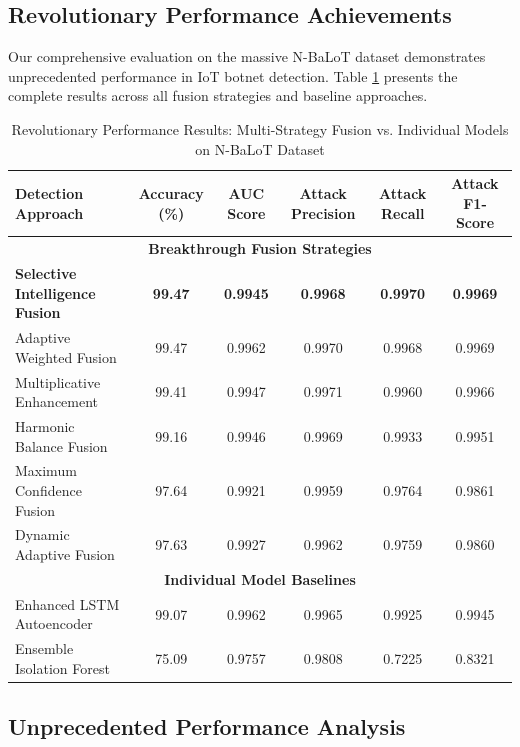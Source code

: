 \documentclass[conference]{IEEEtran}
\begin{document}
\subsection{Revolutionary Performance Achievements}

Our comprehensive evaluation on the massive N-BaLoT dataset demonstrates unprecedented performance in IoT botnet detection. Table \ref{tab:performance_breakthrough} presents the complete results across all fusion strategies and baseline approaches.

\begin{table}[!t]
\centering
\caption{Revolutionary Performance Results: Multi-Strategy Fusion vs. Individual Models on N-BaLoT Dataset}
\label{tab:performance_breakthrough}
\begin{tabular}{@{}lccccc@{}}
\toprule
\textbf{Detection Approach} & \textbf{Accuracy (\%)} & \textbf{AUC Score} & \textbf{Attack Precision} & \textbf{Attack Recall} & \textbf{Attack F1-Score} \\
\midrule
\multicolumn{6}{c}{\textbf{Breakthrough Fusion Strategies}} \\
\midrule
\textbf{Selective Intelligence Fusion} & \textbf{99.47} & \textbf{0.9945} & \textbf{0.9968} & \textbf{0.9970} & \textbf{0.9969} \\
Adaptive Weighted Fusion & 99.47 & 0.9962 & 0.9970 & 0.9968 & 0.9969 \\
Multiplicative Enhancement & 99.41 & 0.9947 & 0.9971 & 0.9960 & 0.9966 \\
Harmonic Balance Fusion & 99.16 & 0.9946 & 0.9969 & 0.9933 & 0.9951 \\
Maximum Confidence Fusion & 97.64 & 0.9921 & 0.9959 & 0.9764 & 0.9861 \\
Dynamic Adaptive Fusion & 97.63 & 0.9927 & 0.9962 & 0.9759 & 0.9860 \\
\midrule
\multicolumn{6}{c}{\textbf{Individual Model Baselines}} \\
\midrule
Enhanced LSTM Autoencoder & 99.07 & 0.9962 & 0.9965 & 0.9925 & 0.9945 \\
Ensemble Isolation Forest & 75.09 & 0.9757 & 0.9808 & 0.7225 & 0.8321 \\
\bottomrule
\end{tabular}
\end{table}

\subsection{Unprecedented Performance Analysis}
\end{document}
